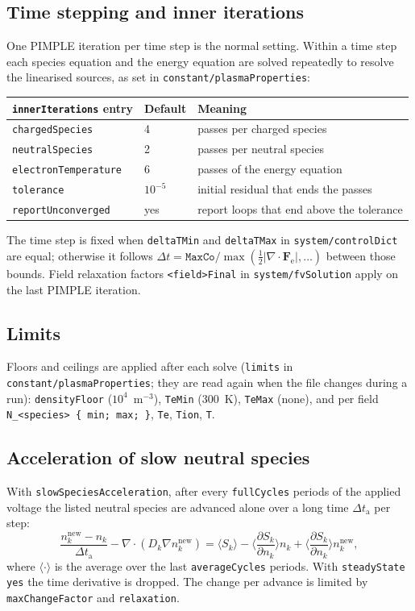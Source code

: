\documentclass[11pt,a4paper]{article}
\newcommand{\kw}[1]{\texttt{#1}}
\newcommand{\pd}[2]{\frac{\partial #1}{\partial #2}}
\begin{document}
\subsection{Time stepping and inner iterations}

One PIMPLE iteration per time step is the normal setting. Within a time step
each species equation and the energy equation are solved repeatedly to
resolve the linearised sources, as set in \kw{constant/plasmaProperties}:
\begin{center}
\begin{tabular}{@{}lll@{}}
\toprule
\kw{innerIterations} entry & Default & Meaning \\
\midrule
\kw{chargedSpecies} & 4 & passes per charged species \\
\kw{neutralSpecies} & 2 & passes per neutral species \\
\kw{electronTemperature} & 6 & passes of the energy equation \\
\kw{tolerance} & $10^{-5}$ & initial residual that ends the passes \\
\kw{reportUnconverged} & yes & report loops that end above the tolerance \\
\bottomrule
\end{tabular}
\end{center}
The time step is fixed when \kw{deltaTMin} and \kw{deltaTMax} in
\kw{system/controlDict} are equal; otherwise it follows
$\Delta t=\kw{MaxCo}/\max(\tfrac12|\nabla\cdot\mathbf{F}_\mathrm{e}|,\dots)$
between those bounds. Field relaxation factors \kw{<field>Final} in
\kw{system/fvSolution} apply on the last PIMPLE iteration.

\subsection{Limits}

Floors and ceilings are applied after each solve (\kw{limits} in
\kw{constant/plasmaProperties}; they are read again when the file changes
during a run):
\kw{densityFloor} ($10^{4}$~m$^{-3}$), \kw{TeMin} (300~K), \kw{TeMax}
(none), and per field \kw{N\_<species> \{ min; max; \}}, \kw{Te}, \kw{Tion},
\kw{T}.

\subsection{Acceleration of slow neutral species}

With \kw{slowSpeciesAcceleration}, after every \kw{fullCycles} periods of the
applied voltage the listed neutral species are advanced alone over a long
time $\Delta t_\mathrm{a}$ per step:
\begin{equation}
\frac{n_k^{\mathrm{new}}-n_k}{\Delta t_\mathrm{a}}
 - \nabla\cdot(D_k\nabla n_k^{\mathrm{new}})
 = \langle S_k\rangle - \Big\langle\pd{S_k}{n_k}\Big\rangle n_k
   + \Big\langle\pd{S_k}{n_k}\Big\rangle n_k^{\mathrm{new}} ,
\end{equation}
where $\langle\cdot\rangle$ is the average over the last \kw{averageCycles}
periods. With \kw{steadyState yes} the time derivative is dropped. The change
per advance is limited by \kw{maxChangeFactor} and \kw{relaxation}.
\end{document}

